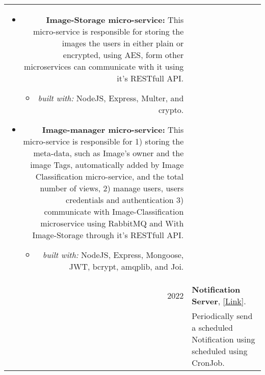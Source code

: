 \documentclass[a4paper,10pt]{article}
\begin{document}
\begin{longtable}{r p{16cm}}
\begin{itemize}
            \item \textbf{Image-Storage micro-service:}
            This micro-service is responsible for storing the images the users in either plain or encrypted, using AES, form other microservices can communicate with it using it's RESTfull API.
            \begin{itemize}
                \item \textit{built with: } NodeJS, Express, Multer, and crypto.
            \end{itemize}

            \item \textbf{Image-manager micro-service:}
            This micro-service is responsible for 1) storing the meta-data, such as Image's owner and the image Tags, automatically added by Image Classification micro-service, and the total number of views, 2) manage users, users credentials and authentication 3) communicate with Image-Classification microservice using RabbitMQ and With Image-Storage through it's RESTfull API.
            \begin{itemize}
                \item \textit{built with: }NodeJS, Express, Mongoose, JWT, bcrypt, amqplib, and Joi.
            \end{itemize}
        \end{itemize}\\

        2022  & \textbf{Notification Server}, [\href{https://github.com/zaky-fetoh/Learning-Backend-Development-Using-NodeJS/tree/main/Day10_NotificationSerWithCronJob}{Link}].\\&
        Periodically send a scheduled Notification using scheduled using CronJob. \\
    \end{longtable}

\label{LastPage}
\end{document}

